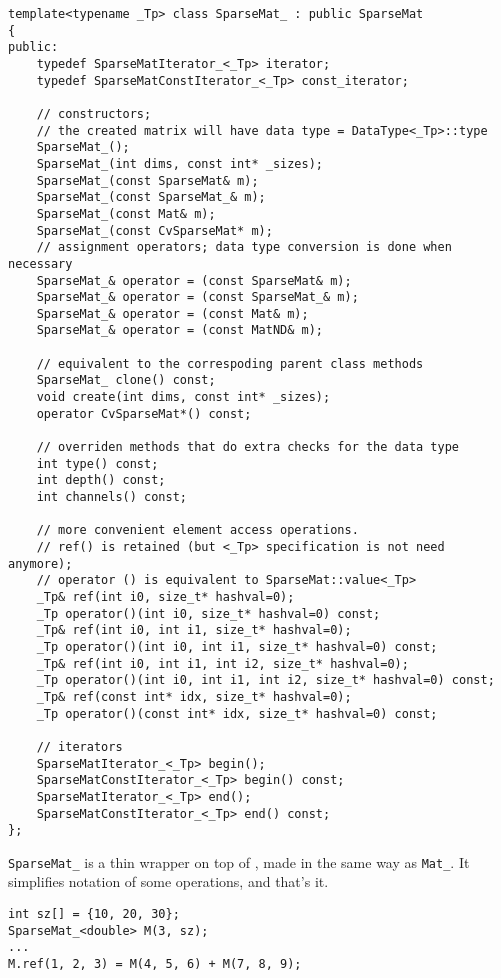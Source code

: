 \begin{lstlisting}
template<typename _Tp> class SparseMat_ : public SparseMat
{
public:
    typedef SparseMatIterator_<_Tp> iterator;
    typedef SparseMatConstIterator_<_Tp> const_iterator;

    // constructors;
    // the created matrix will have data type = DataType<_Tp>::type
    SparseMat_();
    SparseMat_(int dims, const int* _sizes);
    SparseMat_(const SparseMat& m);
    SparseMat_(const SparseMat_& m);
    SparseMat_(const Mat& m);
    SparseMat_(const CvSparseMat* m);
    // assignment operators; data type conversion is done when necessary
    SparseMat_& operator = (const SparseMat& m);
    SparseMat_& operator = (const SparseMat_& m);
    SparseMat_& operator = (const Mat& m);
    SparseMat_& operator = (const MatND& m);

    // equivalent to the correspoding parent class methods
    SparseMat_ clone() const;
    void create(int dims, const int* _sizes);
    operator CvSparseMat*() const;

    // overriden methods that do extra checks for the data type
    int type() const;
    int depth() const;
    int channels() const;
    
    // more convenient element access operations.
    // ref() is retained (but <_Tp> specification is not need anymore);
    // operator () is equivalent to SparseMat::value<_Tp>
    _Tp& ref(int i0, size_t* hashval=0);
    _Tp operator()(int i0, size_t* hashval=0) const;
    _Tp& ref(int i0, int i1, size_t* hashval=0);
    _Tp operator()(int i0, int i1, size_t* hashval=0) const;
    _Tp& ref(int i0, int i1, int i2, size_t* hashval=0);
    _Tp operator()(int i0, int i1, int i2, size_t* hashval=0) const;
    _Tp& ref(const int* idx, size_t* hashval=0);
    _Tp operator()(const int* idx, size_t* hashval=0) const;

    // iterators
    SparseMatIterator_<_Tp> begin();
    SparseMatConstIterator_<_Tp> begin() const;
    SparseMatIterator_<_Tp> end();
    SparseMatConstIterator_<_Tp> end() const;
};
\end{lstlisting}

\texttt{SparseMat\_} is a thin wrapper on top of , made in the same way as \texttt{Mat\_}.
It simplifies notation of some operations, and that's it.
\begin{lstlisting}
int sz[] = {10, 20, 30};
SparseMat_<double> M(3, sz);
...
M.ref(1, 2, 3) = M(4, 5, 6) + M(7, 8, 9);
\end{lstlisting}
\fi
